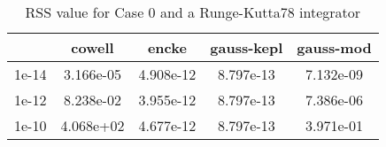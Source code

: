 \begin{table}
\centering
\begin{tabular}{|c|c|c|c|c|}
\hline
 & cowell & encke & gauss-kepl & gauss-mod \\
\hline
1e-14 & 3.166e-05 & 4.908e-12 & 8.797e-13 & 7.132e-09 \\
\hline
1e-12 & 8.238e-02 & 3.955e-12 & 8.797e-13 & 7.386e-06 \\
\hline
1e-10 & 4.068e+02 & 4.677e-12 & 8.797e-13 & 3.971e-01 \\
\hline
\end{tabular}
\caption{RSS value for Case 0 and a Runge-Kutta78 integrator}
\label{table:tab:keplerapprox_rss_C0_Runge-Kutta78}
\end{table}
